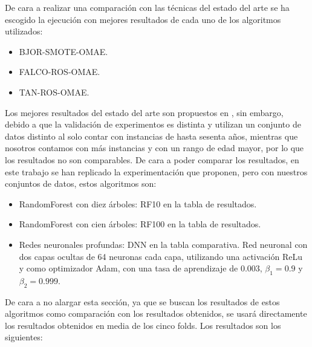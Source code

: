 De cara a realizar una comparación con las técnicas del estado del arte se ha escogido la ejecución con mejores resultados de cada uno de los algoritmos utilizados:

\begin{itemize}
	\item BJOR-SMOTE-OMAE.
	\item FALCO-ROS-OMAE.
	\item TAN-ROS-OMAE.
\end{itemize}

Los mejores resultados del estado del arte son propuestos en \cite{NSLVOrdAge}, sin embargo, debido a que la validación de experimentos es distinta y utilizan un conjunto de datos distinto al solo contar con instancias de hasta sesenta años, mientras que nosotros contamos con más instancias y con un rango de edad mayor, por lo que los resultados no son comparables. De cara a poder comparar los resultados, en este trabajo se han replicado la experimentación que proponen, pero con nuestros conjuntos de datos, estos algoritmos son:

\begin{itemize}
	\item RandomForest con diez árboles: RF10 en la tabla de resultados.
	\item RandomForest con cien árboles: RF100 en la tabla de resultados.
	\item Redes neuronales profundas: DNN en la tabla comparativa. Red neuronal con dos capas ocultas de 64 neuronas cada capa, utilizando una activación ReLu y como optimizador Adam, con una tasa de aprendizaje de $0.003$, $\beta_1 = 0.9$ y $\beta_2 = 0.999$.
\end{itemize}

De cara a no alargar esta sección, ya que se buscan los resultados de estos algoritmos como comparación con los resultados obtenidos, se usará directamente los resultados obtenidos en media de los cinco folds. Los resultados son los siguientes:


